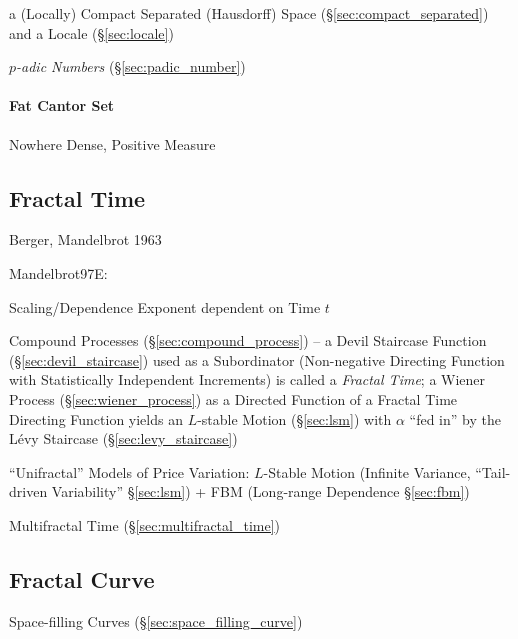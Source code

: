 a (Locally) Compact Separated (Hausdorff) Space (\S\ref{sec:compact_separated})
and a Locale (\S\ref{sec:locale})

\emph{$p$-adic Numbers} (\S\ref{sec:padic_number})



\paragraph{Fat Cantor Set}\label{sec:fat_cantor_set}\hfill

Nowhere Dense, Positive Measure



\subsection{Fractal Time}\label{sec:fractal_time}

Berger, Mandelbrot 1963

Mandelbrot97E:

Scaling/Dependence Exponent dependent on Time $t$

Compound Processes (\S\ref{sec:compound_process}) -- a Devil Staircase Function
(\S\ref{sec:devil_staircase}) used as a Subordinator (Non-negative Directing
Function with Statistically Independent Increments) is called a \emph{Fractal
  Time}; a Wiener Process (\S\ref{sec:wiener_process}) as a Directed Function of
a Fractal Time Directing Function yields an $L$-stable Motion (\S\ref{sec:lsm})
with $\alpha$ ``fed in'' by the L\'evy Staircase (\S\ref{sec:levy_staircase})

``Unifractal'' Models of Price Variation: $L$-Stable Motion
(Infinite Variance, ``Tail-driven Variability'' \S\ref{sec:lsm}) + FBM
(Long-range Dependence \S\ref{sec:fbm})

\fist Multifractal Time (\S\ref{sec:multifractal_time})



\subsection{Fractal Curve}\label{sec:fractal_curve}

Space-filling Curves (\S\ref{sec:space_filling_curve})

